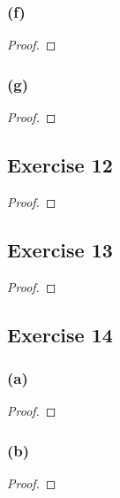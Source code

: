 \documentclass[14pt]{extarticle}
\begin{document}
\subsubsection{(f)}

\begin{proof}

\end{proof}

\subsubsection{(g)}

\begin{proof}

\end{proof}

\subsection{Exercise 12}

\begin{proof}

\end{proof}

\subsection{Exercise 13}

\begin{proof}

\end{proof}

\subsection{Exercise 14}

\subsubsection{(a)}

\begin{proof}

\end{proof}

\subsubsection{(b)}

\begin{proof}

\end{proof}
\end{document}
